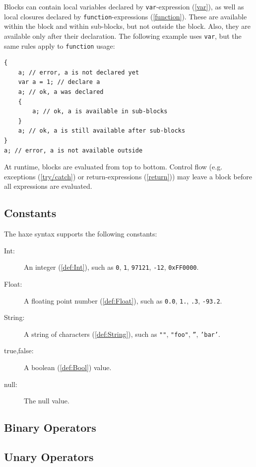 \documentclass{article}
\newcommand{\expr}[1]{\texttt{#1}}
\begin{document}
Blocks can contain local variables declared by \expr{var}-expression (\cref{var}), as well as local closures declared by \expr{function}-expressions (\cref{function}). These are available within the block and within sub-blocks, but not outside the block. Also, they are available only after their declaration. The following example uses \expr{var}, but the same rules apply to \expr{function} usage:

\begin{lstlisting}
{
	a; // error, a is not declared yet
	var a = 1; // declare a
	a; // ok, a was declared
	{
		a; // ok, a is available in sub-blocks
	}
	a; // ok, a is still available after sub-blocks
}
a; // error, a is not available outside
\end{lstlisting}
At runtime, blocks are evaluated from top to bottom. Control flow (e.g. exceptions (\cref{try/catch}) or return-expressions (\cref{return})) may leave a block before all expressions 
are evaluated.


\subsection{Constants}
\label{Constants}

The haxe syntax supports the following constants:

\begin{description}
	\item[Int:] An integer (\cref{def:Int}), such as \expr{0}, \expr{1}, \expr{97121}, \expr{-12}, \expr{0xFF0000}.
	\item[Float:] A floating point number (\cref{def:Float}), such as \expr{0.0}, \expr{1.}, \expr{.3}, \expr{-93.2}.
	\item[String:] A string of characters (\cref{def:String}), such as \expr{""}, \expr{"foo"}, \expr{''}, \expr{'bar'}.
	\item[true,false:] A boolean (\cref{def:Bool}) value.
	\item[null:] The null value.
\end{description}


\subsection{Binary Operators}

\subsection{Unary Operators}
\end{document}
